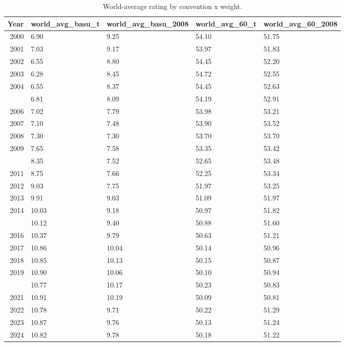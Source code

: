 \begin{table}

\caption{\label{tab:tab:basu_world_avg}World-average rating by convention x weight.}
\centering
\begin{tabular}[t]{rllll}
\toprule
Year & world\_avg\_basu\_t & world\_avg\_basu\_2008 & world\_avg\_60\_t & world\_avg\_60\_2008\\
\midrule
2000 & 6.90 & 9.25 & 54.10 & 51.75\\
2001 & 7.03 & 9.17 & 53.97 & 51.83\\
2002 & 6.55 & 8.80 & 54.45 & 52.20\\
2003 & 6.28 & 8.45 & 54.72 & 52.55\\
2004 & 6.55 & 8.37 & 54.45 & 52.63\\
\addlinespace
2005 & 6.81 & 8.09 & 54.19 & 52.91\\
2006 & 7.02 & 7.79 & 53.98 & 53.21\\
2007 & 7.10 & 7.48 & 53.90 & 53.52\\
2008 & 7.30 & 7.30 & 53.70 & 53.70\\
2009 & 7.65 & 7.58 & 53.35 & 53.42\\
\addlinespace
2010 & 8.35 & 7.52 & 52.65 & 53.48\\
2011 & 8.75 & 7.66 & 52.25 & 53.34\\
2012 & 9.03 & 7.75 & 51.97 & 53.25\\
2013 & 9.91 & 9.03 & 51.09 & 51.97\\
2014 & 10.03 & 9.18 & 50.97 & 51.82\\
\addlinespace
2015 & 10.12 & 9.40 & 50.88 & 51.60\\
2016 & 10.37 & 9.79 & 50.63 & 51.21\\
2017 & 10.86 & 10.04 & 50.14 & 50.96\\
2018 & 10.85 & 10.13 & 50.15 & 50.87\\
2019 & 10.90 & 10.06 & 50.10 & 50.94\\
\addlinespace
2020 & 10.77 & 10.17 & 50.23 & 50.83\\
2021 & 10.91 & 10.19 & 50.09 & 50.81\\
2022 & 10.78 & 9.71 & 50.22 & 51.29\\
2023 & 10.87 & 9.76 & 50.13 & 51.24\\
2024 & 10.82 & 9.78 & 50.18 & 51.22\\
\bottomrule
\end{tabular}
\end{table}
